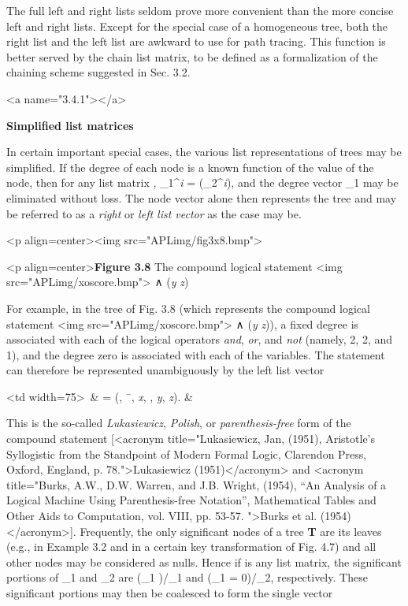 {\par The full left and right lists seldom prove more convenient than the more concise left and right lists. Except for the special case of a homogeneous tree, both the right list and the left list are awkward to use for path tracing. This function is better served by the chain list matrix, to be defined as a formalization of the chaining scheme suggested in Sec. 3.2.



<a name="3.4.1"></a>
\par \textbf{Simplified list matrices}

\par In certain important special cases, the various list representations of trees may be simplified. If the degree of each node is a known function \textit{\delta} of the value of the node, then for any list matrix 
, 
_{1}^{\textit{i}} = 
\textit{\delta}(_{2}^{\textit{i}}), and the degree vector _{1} may be eliminated without loss. The node vector alone then represents the tree and may be referred to as a
\textit{right} or \textit{left list vector} as the case may be.

<p align=center><img src="APLimg/fig3x8.bmp">

<p align=center>\textbf{Figure 3.8} The compound logical statement 
<img src="APLimg/xoscore.bmp"> ∧ (\textit{y} \vee \textit{z})

\par For example, in the tree of Fig. 3.8 (which represents the compound logical statement 
<img src="APLimg/xoscore.bmp"> 
∧ (\textit{y} \vee \textit{z})), a fixed degree is associated with each of the logical operators
\textit{and}, \textit{or}, and \textit{not} (namely, 2, 2, and 1), and the degree zero is associated with each of the variables. The statement can therefore be represented unambiguously by the left list vector

\begin{tabularx}
<td width=75>\ & 
 = (\wedge, ¯, \textit{x}, \vee, \textit{y}, \textit{z}). & \\
\end{tabularx}

\par This is the so-called \textit{Lukasiewicz}, \textit{Polish}, or \textit{parenthesis-free} form of the compound statement [<acronym title="Lukasiewicz, Jan, (1951), Aristotle’s Syllogistic from the Standpoint of Modern Formal Logic, Clarendon Press, Oxford, England, p. 78.">Lukasiewicz (1951)</acronym> and 
<acronym title="Burks, A.W., D.W. Warren, and J.B. Wright, (1954), “An Analysis of a Logical Machine Using Parenthesis-free Notation”, Mathematical Tables and Other Aids to Computation, vol. VIII, pp. 53-57. ">Burks et al. (1954)</acronym>]. Frequently, the only significant nodes of a tree \textbf{T} are its leaves (e.g., in Example 3.2 and in a certain key transformation of Fig. 4.7) and all other nodes may be considered as nulls. Hence if  is any list matrix, the significant portions of _{1} and _{2} are (_{1} )/_{1} and 
(_{1} = 0)/_{2}, respectively. These significant portions may then be coalesced to form the single vector

}
